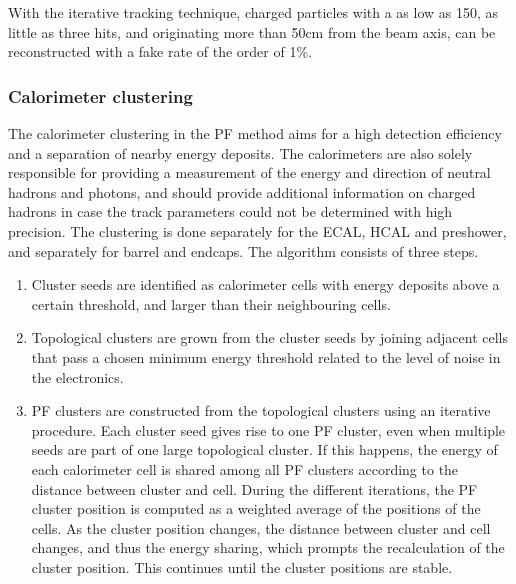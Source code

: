 With the iterative tracking technique, charged particles with a \pt as low as 150\MeV, as little
as three hits, and originating more than 50\unit{cm} from the beam axis, can be reconstructed with a
fake rate of the order of 1\%. 

\subsubsection{Calorimeter clustering}

The calorimeter clustering in the PF method aims for a high detection efficiency and a separation
of nearby energy deposits. 
The calorimeters are also solely responsible for providing a measurement of the energy and direction
of neutral hadrons and photons, and should provide additional information on charged hadrons in
case the track parameters could not be determined with high precision. 
The clustering is done separately for the ECAL, HCAL and preshower, and separately for barrel and
endcaps.
The algorithm consists of three steps. 
\begin{enumerate}
  \item Cluster seeds are identified as calorimeter cells with energy deposits above a certain
threshold, and larger than their neighbouring cells. 
  \item Topological clusters are grown from the cluster seeds by joining adjacent cells that pass a
chosen minimum energy threshold related to the level of noise in the electronics. 
  \item PF clusters are constructed from the topological clusters using an iterative procedure. Each
cluster seed gives rise to one PF cluster, even when multiple seeds are part of one large
topological cluster. If this happens, the energy of each calorimeter cell is shared among all PF
clusters according to the distance between cluster and cell. During the different iterations, the
PF cluster position is computed as a weighted average of the positions of the cells. As the
cluster position changes, the distance between cluster and cell changes, and thus the energy
sharing, which prompts the recalculation of the cluster position. This continues until the cluster
positions are stable. 
\end{enumerate}



